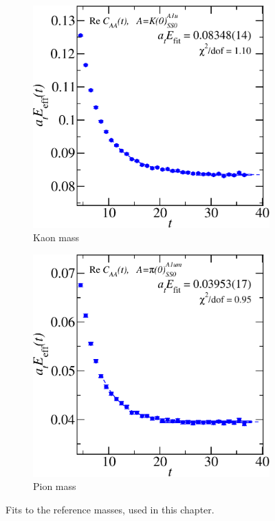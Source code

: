 \begin{figure}
  \centering
  \begin{subfigure}{0.4\textwidth}
    \centering
    \includegraphics[width=\textwidth]{figures/kaon_crop.pdf}
    \caption{Kaon mass}\label{fig:kaon}
  \end{subfigure}\hfill
  \begin{subfigure}{0.4\textwidth}
    \centering
    \includegraphics[width=\textwidth]{figures/pion_crop.pdf}
    \caption{Pion mass}\label{fig:pion}
  \end{subfigure}
  \caption{Fits to the reference masses, used in this chapter.}
\end{figure}

